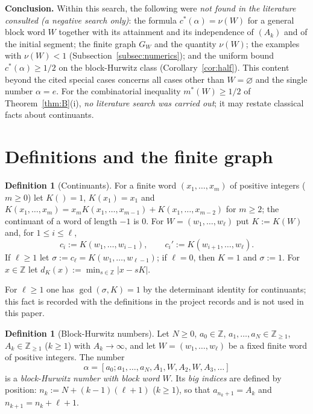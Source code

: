 \documentclass[11pt]{amsart}
\theoremstyle{definition}
\newtheorem{definition}[theorem]{Definition}
\theoremstyle{remark}
\newcommand{\Z}{\mathbb{Z}}
\begin{document}
\medskip\noindent\textbf{Conclusion.} Within this search, the following were \emph{not found in the literature
consulted (a negative search only)}: the formula $c^*(\alpha)=\nu(W)$ for a general block word $W$ together with its
attainment and its independence of $(A_k)$ and of the initial segment; the finite graph $G_W$ and the quantity
$\nu(W)$; the examples with $\nu(W)<1$ (Subsection~\ref{subsec:numerics}); and the uniform bound $c^*(\alpha)\ge1/2$
on the block-Hurwitz class (Corollary~\ref{cor:half}). This content beyond the cited special cases concerns all
cases other than $W=\varnothing$ and the single number $\alpha=e$. For the combinatorial inequality $m^*(W)\ge1/2$ of
Theorem~\ref{thm:B}(i), \emph{no literature search was carried out}; it may restate classical facts about continuants.

\section{Definitions and the finite graph}\label{sec:defs}

\begin{definition}[Continuants]\label{def:cont}
For a finite word $(x_1,\dots,x_m)$ of positive integers ($m\ge0$) let $K()=1$, $K(x_1)=x_1$ and
$K(x_1,\dots,x_m)=x_mK(x_1,\dots,x_{m-1})+K(x_1,\dots,x_{m-2})$ for $m\ge2$; the continuant of a word of
length $-1$ is $0$. For $W=(w_1,\dots,w_\ell)$ put $K:=K(W)$ and, for $1\le i\le\ell$,
\[
c_i:=K(w_1,\dots,w_{i-1}),\qquad c_i':=K(w_{i+1},\dots,w_\ell).
\]
If $\ell\ge1$ let $\sigma:=c_\ell=K(w_1,\dots,w_{\ell-1})$; if $\ell=0$, then $K=1$ and $\sigma:=1$.
For $x\in\Z$ let $d_K(x):=\min_{s\in\Z}|x-sK|$.
\end{definition}

For $\ell\ge1$ one has $\gcd(\sigma,K)=1$ by the determinant identity for continuants; this fact is recorded
with the definitions in the project records and is not used in this paper.

\begin{definition}[Block-Hurwitz numbers]\label{def:BH}
Let $N\ge0$, $a_0\in\Z$, $a_1,\dots,a_N\in\Z_{\ge1}$, $A_k\in\Z_{\ge1}$ ($k\ge1$) with $A_k\to\infty$, and let
$W=(w_1,\dots,w_\ell)$ be a fixed finite word of positive integers. The number
\[
\alpha=[a_0;a_1,\dots,a_N,A_1,W,A_2,W,A_3,\dots]
\]
is a \emph{block-Hurwitz number with block word $W$}. Its \emph{big indices} are defined by position:
$n_k:=N+(k-1)(\ell+1)$ ($k\ge1$), so that $a_{n_k+1}=A_k$ and $n_{k+1}=n_k+\ell+1$.
\end{definition}
\end{document}
